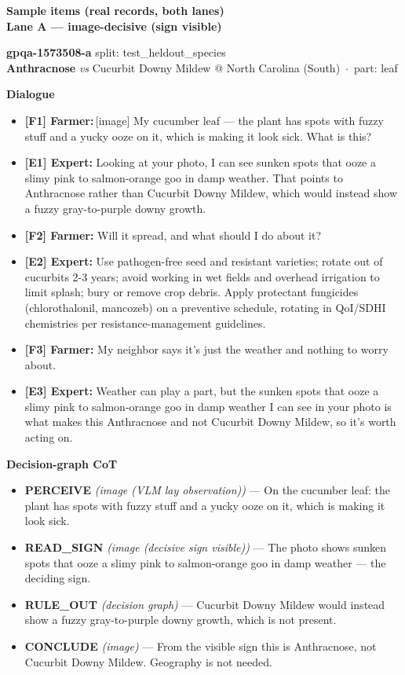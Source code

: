 \documentclass[11pt]{article}
\begin{document}
\newpage
\newpage
\textbf{\large Sample items (real records, both lanes)}\\[2pt]
\textbf{Lane A --- image-decisive (sign visible)}\\[2pt]
\colorbox{lav}{\parbox{\dimexpr\textwidth-2\fboxsep}{\textbf{gpqa-1573508-a} \hfill split: test\_heldout\_species\\\textbf{Anthracnose} \emph{vs} Cucurbit Downy Mildew \quad @ North Carolina (South) \,$\cdot$\, part: leaf}}
\vspace{4pt}\textbf{Dialogue}
\begin{itemize}[leftmargin=1.1em,itemsep=2pt,label={}]
\item \textbf{[F1] Farmer:}\,\textcolor{grn}{[image]} My cucumber leaf --- the plant has spots with fuzzy stuff and a yucky ooze on it, which is making it look sick. What is this?
\item \textbf{[E1] Expert:} Looking at your photo, I can see sunken spots that ooze a slimy pink to salmon-orange goo in damp weather. That points to Anthracnose rather than Cucurbit Downy Mildew, which would instead show a fuzzy gray-to-purple downy growth.
\item \textbf{[F2] Farmer:} Will it spread, and what should I do about it?
\item \textbf{[E2] Expert:} Use pathogen-free seed and resistant varieties; rotate out of cucurbits 2-3 years; avoid working in wet fields and overhead irrigation to limit splash; bury or remove crop debris. Apply protectant fungicides (chlorothalonil, mancozeb) on a preventive schedule, rotating in QoI/SDHI chemistries per resistance-management guidelines.
\item \textbf{[F3] Farmer:} My neighbor says it's just the weather and nothing to worry about.
\item \textbf{[E3] Expert:} Weather can play a part, but the sunken spots that ooze a slimy pink to salmon-orange goo in damp weather I can see in your photo is what makes this Anthracnose and not Cucurbit Downy Mildew, so it's worth acting on.
\end{itemize}
\textbf{Decision-graph CoT}
\begin{itemize}[leftmargin=1.1em,itemsep=1pt]
\item \textbf{PERCEIVE} {\footnotesize\textit{(image (VLM lay observation))}} --- On the cucumber leaf: the plant has spots with fuzzy stuff and a yucky ooze on it, which is making it look sick.
\item \textbf{READ\_SIGN} {\footnotesize\textit{(image (decisive sign visible))}} --- The photo shows sunken spots that ooze a slimy pink to salmon-orange goo in damp weather --- the deciding sign.
\item \textbf{RULE\_OUT} {\footnotesize\textit{(decision graph)}} --- Cucurbit Downy Mildew would instead show a fuzzy gray-to-purple downy growth, which is not present.
\item \textbf{CONCLUDE} {\footnotesize\textit{(image)}} --- From the visible sign this is Anthracnose, not Cucurbit Downy Mildew. Geography is not needed.
\end{itemize}
\end{document}
